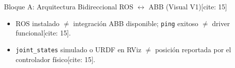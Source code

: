 \documentclass[aspectratio=169, xcolor={table,xcdraw}]{beamer}
\begin{document}
\begin{frame}{Bloque A: Arquitectura Bidireccional ROS $\leftrightarrow$ ABB (Visual V1)[cite: 15]}
    \vspace{0.15cm}
    \begin{tcolorbox}[colback=white, colframe=ucbblue, title=Errores Frecuentes de Interpretación {[cite: 15]}, boxsep=1mm, top=1mm, bottom=1mm]
        \scriptsize\raggedright
        \begin{itemize}
            \item ROS instalado $\neq$ integración ABB disponible; \texttt{ping} exitoso $\neq$ driver funcional[cite: 15].
            \item \texttt{joint\_states} simulado o URDF en RViz $\neq$ posición reportada por el controlador físico[cite: 15].
        \end{itemize}
    \end{tcolorbox}
\end{frame}
\end{document}
